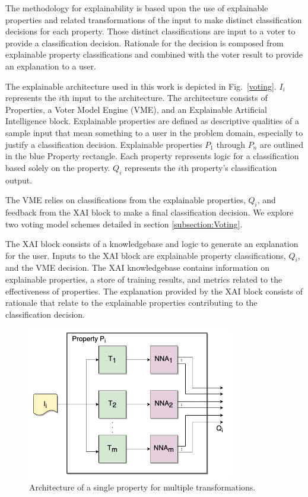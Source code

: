 \documentclass[conference]{IEEEtran}
\begin{document}
The methodology for explainability is based upon the use of explainable properties and related transformations of the input to make distinct classification decisions for each property.  Those distinct classifications are input to a voter to provide a classification decision.  Rationale for the decision is composed from explainable property classifications and combined with the voter result to provide an explanation to a user. 

The explainable architecture used in this work is depicted in Fig.~\ref{voting}.  $I_i$ represents the $i$th input to the architecture.  The architecture consists of Properties, a Voter Model Engine (VME),  and an Explainable Artificial Intelligence block.   Explainable properties are defined as descriptive qualities of a sample input that mean something to a user in the problem domain, especially to justify a classification decision.   Explainable properties $P_1$ through $P_n$ are outlined in the blue Property rectangle.  Each property represents logic for a classification based solely on the property.   $Q_i$ represents the $i$th property's classification output.

The VME relies on classifications from the explainable properties, $Q_i$, and feedback from the XAI block to make a final classification decision.   We explore two voting model schemes detailed in section \ref{subsection:Voting}.

The XAI block consists of a knowledgebase and logic to generate an explanation for the user.  Inputs to the XAI block are explainable property classifications, $Q_i$, and the VME decision.  The XAI knowledgebase contains information on explainable properties,  a store of training results, and metrics related to the effectiveness of properties.  The explanation provided by the XAI block consists of rationale that relate to the explainable properties contributing to the classification decision.

 \begin{figure}[htbp]
\centerline{\includegraphics[width=90mm]{./images/property_transforms.png}}
\caption{Architecture of a single property for multiple transformations.}
\label{proptrans}
\end{figure} 
\end{document}
